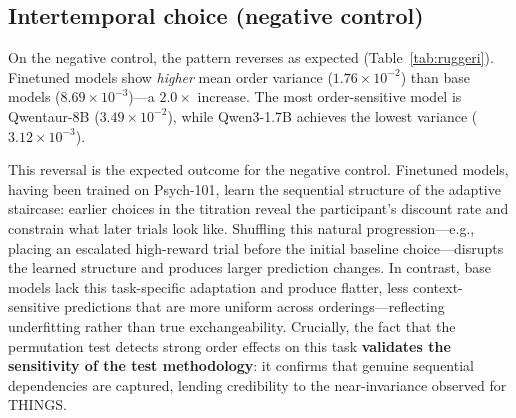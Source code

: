 \documentclass[11pt]{article}
\begin{document}
\subsection{Intertemporal choice (negative control)}

On the negative control, the pattern reverses as expected (Table~\ref{tab:ruggeri}).
Finetuned models show \emph{higher} mean order variance ($1.76 \times 10^{-2}$) than base models ($8.69 \times 10^{-3}$)---a $2.0\times$ increase.
The most order-sensitive model is Qwentaur-8B ($3.49 \times 10^{-2}$), while Qwen3-1.7B achieves the lowest variance ($3.12 \times 10^{-3}$).

This reversal is the expected outcome for the negative control.
Finetuned models, having been trained on Psych-101, learn the sequential structure of the adaptive staircase: earlier choices in the titration reveal the participant's discount rate and constrain what later trials look like.
Shuffling this natural progression---e.g., placing an escalated high-reward trial before the initial baseline choice---disrupts the learned structure and produces larger prediction changes.
In contrast, base models lack this task-specific adaptation and produce flatter, less context-sensitive predictions that are more uniform across orderings---reflecting underfitting rather than true exchangeability.
Crucially, the fact that the permutation test detects strong order effects on this task \textbf{validates the sensitivity of the test methodology}: it confirms that genuine sequential dependencies are captured, lending credibility to the near-invariance observed for THINGS.
\end{document}

